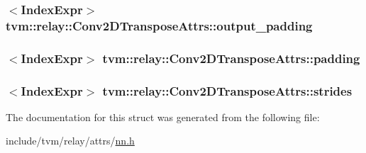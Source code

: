 \subsubsection[{\texorpdfstring{output\+\_\+padding}{output_padding}}]{$<${\bf Index\+Expr}$>$ tvm\+::relay\+::\+Conv2\+D\+Transpose\+Attrs\+::output\+\_\+padding}\hypertarget{structtvm_1_1relay_1_1Conv2DTransposeAttrs_ac7bd13f11eeec17e9e9c97f6ff09924d}{}\label{structtvm_1_1relay_1_1Conv2DTransposeAttrs_ac7bd13f11eeec17e9e9c97f6ff09924d}
\subsubsection[{\texorpdfstring{padding}{padding}}]{$<${\bf Index\+Expr}$>$ tvm\+::relay\+::\+Conv2\+D\+Transpose\+Attrs\+::padding}\hypertarget{structtvm_1_1relay_1_1Conv2DTransposeAttrs_aa09a7575475716d658595c23e6a1b399}{}\label{structtvm_1_1relay_1_1Conv2DTransposeAttrs_aa09a7575475716d658595c23e6a1b399}
\subsubsection[{\texorpdfstring{strides}{strides}}]{$<${\bf Index\+Expr}$>$ tvm\+::relay\+::\+Conv2\+D\+Transpose\+Attrs\+::strides}\hypertarget{structtvm_1_1relay_1_1Conv2DTransposeAttrs_a2cca4ce8d1729231cb667f810a14ba77}{}\label{structtvm_1_1relay_1_1Conv2DTransposeAttrs_a2cca4ce8d1729231cb667f810a14ba77}


The documentation for this struct was generated from the following file\+:\begin{DoxyCompactItemize}
\item 
include/tvm/relay/attrs/\hyperlink{include_2tvm_2relay_2attrs_2nn_8h}{nn.\+h}\end{DoxyCompactItemize}
